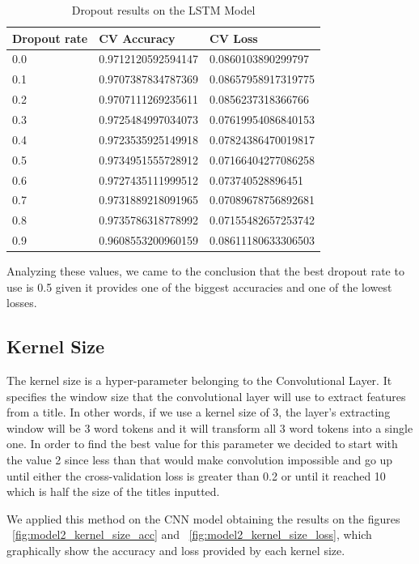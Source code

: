 \documentclass[conference]{IEEEtran}
\begin{document}
\begin{table}[H]
\centering
\caption{Dropout results on the LSTM Model}
\begin{tabular}{ | m{3.5em} | m{3.2cm}| m{3.2cm} | } 
\hline
Dropout rate & CV Accuracy & CV Loss \\ 
\hline
0.0 & 0.9712120592594147 & 0.0860103890299797 \\
\hline
0.1 & 0.9707387834787369 & 0.08657958917319775 \\
\hline
0.2 & 0.9707111269235611 & 0.0856237318366766 \\
\hline
0.3 & 0.9725484997034073 & 0.07619954086840153 \\
\hline
0.4 & 0.9723535925149918 & 0.07824386470019817 \\
\hline
0.5 & 0.9734951555728912 & 0.07166404277086258 \\
\hline
0.6 & 0.9727435111999512 & 0.073740528896451 \\
\hline
0.7 & 0.9731889218091965 & 0.07089678756892681 \\
\hline
0.8 & 0.9735786318778992 & 0.07155482657253742 \\
\hline
0.9 & 0.9608553200960159 & 0.08611180633306503 \\
\hline
\end{tabular}
\end{table}

Analyzing these values, we came to the conclusion that the best dropout rate to use is 0.5 given it provides one of the biggest accuracies and one of the lowest losses.

\subsection{Kernel Size}
The kernel size is a hyper-parameter belonging to the Convolutional Layer. It specifies the window size that the convolutional layer will use to extract features from a title. In other words, if we use a kernel size of 3, the layer's extracting window will be 3 word tokens and it will transform all 3 word tokens into a single one. In order to find the best value for this parameter we decided to start with the value 2 since less than that would make convolution impossible and go up until either the cross-validation loss is greater than 0.2 or until it reached 10 which is half the size of the titles inputted.

We applied this method on the CNN model obtaining the results on the figures ~\ref{fig:model2_kernel_size_acc} and ~\ref{fig:model2_kernel_size_loss}, which graphically show the accuracy and loss provided by each kernel size.
\end{document}
